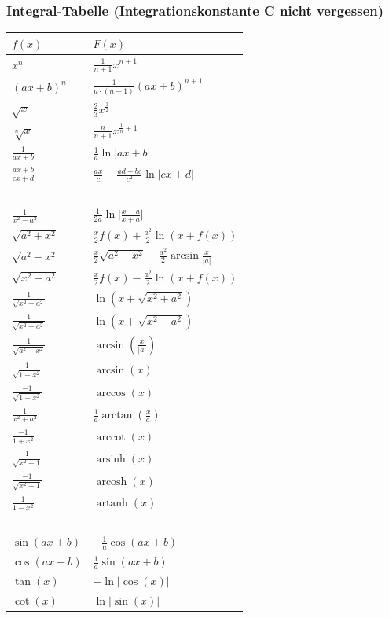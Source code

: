\documentclass[6pt]{article}
\begin{document}
\begin{multicols*}{2}
\pagebreak
\subsubsection*{\underline{Integral-Tabelle} \quad (Integrationskonstante C nicht vergessen)}
\vspace{-1mm}
\begin{multicols}{2}
	\renewcommand\arraystretch{1.5}
	\begin{tabular}{l|l}
		$f(x)$ & $F(x)$ \\ \hline

		$ x^n $   &   $ \frac{1}{n+1} x^{n+1} $ \\
		$ (ax+b)^n $  &  $ \frac{1}{a\cdot(n+1)} (ax+b)^{n+1} $ \\
		$ \sqrt x $  &  $ \frac{2}{3} x^{ \frac{3}{2} } $ \\
		$ \sqrt[n] x $  &  $ \frac{n}{n+1} x^{ \frac{1}{n}+1 } $ \\
		$ \frac{1}{ax+b} $  &  $ \frac{1}{a} \ln |ax+b| $ \\
		$ \frac{ax+b}{cx+d} $  &  $ \frac{ax}{c}-\frac{ad-bc}{c^2} \ln |cx+d| $ \\
		$  $  &  $  $ \\
		$ \frac{1}{x^2-a^2} $  &  $ \frac{1}{2a} \ln { \big| \frac{x-a}{x+a} \big| } $ \\
		$ \sqrt{a^2+x^2} $  &  $ \frac{x}{2} f(x) + \frac{a^2}{2} \ln ( x+f(x) ) $ \\
		$ \sqrt{a^2-x^2} $  &  $ \frac{x}{2} \sqrt{a^2-x^2} - \frac{a^2}{2} \arcsin \frac{x}{|a|}  $ \\
		$ \sqrt{x^2-a^2} $  &  $ \frac{x}{2} f(x) - \frac{a^2}{2} \ln {( x+f(x) )} $ \\
		$ \frac{1}{\sqrt{x^2+a^2}} $  &  $ \ln( x+\sqrt{x^2+a^2} ) $ \\
		$ \frac{1}{\sqrt{x^2-a^2}} $  &  $ \ln( x+\sqrt{x^2-a^2} ) $ \\
		$ \frac{1}{\sqrt{a^2-x^2}} $  &  $ \arcsin( \frac{x}{|a|} ) $ \\
		$ \frac{1}{\sqrt{1-x^2}} $  &  $ \arcsin( x ) $ \\
		$ \frac{-1}{\sqrt{1-x^2}} $  &  $ \arccos(x) $ \\
		$ \frac{1}{x^2+a^2} $  &  $ \frac{1}{a} \arctan(\frac{x}{a}) $ \\
		$ \frac{-1}{1+x^2} $  &  $ \operatorname{arccot}(x) $ \\
		$ \frac{1}{\sqrt{x^2+1}} $  &  $ \operatorname{arsinh} (x) $ \\
		$ \frac{-1}{\sqrt{x^2-1}} $  &  $ \operatorname{arcosh} (x) $ \\
		$ \frac{1}{1-x^2} $  &  $ \operatorname{artanh} (x) $ \\
		$  $  &  $  $ \\
		$ \sin(ax+b) $  &  $-\frac{1}{a}\cos(ax+b)  $ \\
		$ \cos(ax+b) $  &  $ \frac{1}{a}\sin(ax+b) $ \\
		$ \tan(x) $  &  $ -\ln|\cos(x)| $ \\
		$ \cot(x) $  &  $ \ln |\sin(x)| $ \\
	\end{tabular}
	

\end{multicols}
\end{multicols*}
\end{document}
